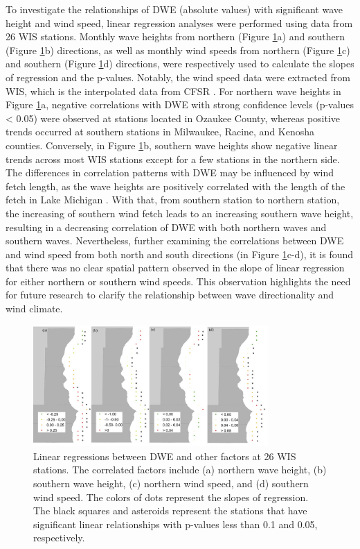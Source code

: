 To investigate the relationships of DWE (absolute values) with significant wave
height and wind speed, linear regression analyses were performed using data from
26 WIS stations. Monthly wave heights from northern (Figure
\ref{fig:fig3.10}a) and southern (Figure \ref{fig:fig3.10}b) directions, as
well as monthly wind speeds from northern (Figure \ref{fig:fig3.10}c) and
southern (Figure \ref{fig:fig3.10}d) directions, were respectively used to
calculate the slopes of regression and the p-values. Notably, the wind speed
data were extracted from WIS, which is the interpolated data from CFSR
\citep{saha_ncep_2010,saha_ncep_2014}. For northern wave heights in Figure
\ref{fig:fig3.10}a, negative correlations with DWE with strong confidence
levels (p-values < 0.05) were observed at stations located in Ozaukee County,
whereas positive trends occurred at southern stations in Milwaukee, Racine, and
Kenosha counties. Conversely, in Figure \ref{fig:fig3.10}b, southern wave
heights show negative linear trends across most WIS stations except for a few
stations in the northern side. The differences in correlation patterns with DWE
may be influenced by wind fetch length, as the wave heights are positively
correlated with the length of the fetch in Lake Michigan
\citep{mason_effective_2018}. With that, from southern station to northern
station, the increasing of southern wind fetch leads to an increasing southern
wave height, resulting in a decreasing correlation of DWE with both northern
waves and southern waves. Nevertheless, further examining the correlations
between DWE and wind speed from both north and south directions (in Figure
\ref{fig:fig3.10}c-d), it is found that there was no clear spatial pattern
observed in the slope of linear regression for either northern or southern wind
speeds. This observation highlights the need for future research to clarify the
relationship between wave directionality and wind climate.

\begin{figure}[htbp]
  \centering
  \includegraphics[width=0.8\textwidth]{chapter3/resources/figure3-10.jpg}
  \caption{Linear regressions between DWE and other factors at 26 WIS stations. The correlated factors include (a) northern wave height, (b) southern wave height, (c) northern wind speed, and (d) southern wind speed. The colors of dots represent the slopes of regression. The black squares and asteroids represent the stations that have significant linear relationships with p-values less than 0.1 and 0.05, respectively.}
  \label{fig:fig3.10}
\end{figure}

